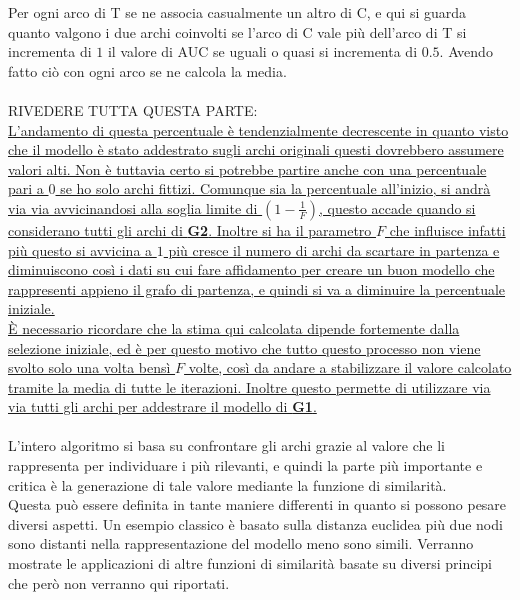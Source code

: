 Per ogni arco di T se ne associa casualmente un altro di C, e qui si guarda quanto valgono i due archi coinvolti se l'arco di C vale più dell'arco di T si incrementa di $1$ il valore di AUC se uguali o quasi si incrementa di $0.5$. Avendo fatto ciò con ogni arco se ne calcola la media.\\
\\
RIVEDERE TUTTA QUESTA PARTE:\\
\uline{L'andamento di questa percentuale è tendenzialmente decrescente in quanto visto che il modello è stato addestrato sugli archi originali questi dovrebbero assumere valori alti. Non è tuttavia certo si potrebbe partire anche con una percentuale pari a $0$ se ho solo archi fittizi. Comunque sia la percentuale all'inizio, si andrà via via avvicinandosi alla soglia limite di $\displaystyle \left( 1- \frac{1}{F} \right)$, questo accade quando si considerano tutti gli archi di \textbf{G2}. Inoltre si ha il parametro $F$ che influisce infatti più questo si avvicina a $1$ più cresce il numero di archi da scartare in partenza e diminuiscono così i dati su cui fare affidamento per creare un buon modello che rappresenti appieno il grafo di partenza, e quindi si va a diminuire la percentuale iniziale.\\
È necessario ricordare che la stima qui calcolata dipende fortemente dalla selezione iniziale, ed è per questo motivo che tutto questo processo non viene svolto solo una volta bensì $F$ volte, così da andare a stabilizzare il valore calcolato tramite la media di tutte le iterazioni. Inoltre questo permette di utilizzare via via tutti gli archi per addestrare il modello di \textbf{G1}.}\\
\\
L'intero algoritmo si basa su confrontare gli archi grazie al valore che li rappresenta per individuare i più rilevanti, e quindi la parte più importante e critica è la generazione di tale valore mediante la funzione di similarità.\\
Questa può essere definita in tante maniere differenti in quanto si possono pesare diversi aspetti. Un esempio classico è basato sulla distanza euclidea più due nodi sono distanti nella rappresentazione del modello meno sono simili. Verranno mostrate le applicazioni di altre funzioni di similarità basate su diversi principi che però non verranno qui riportati.
%
